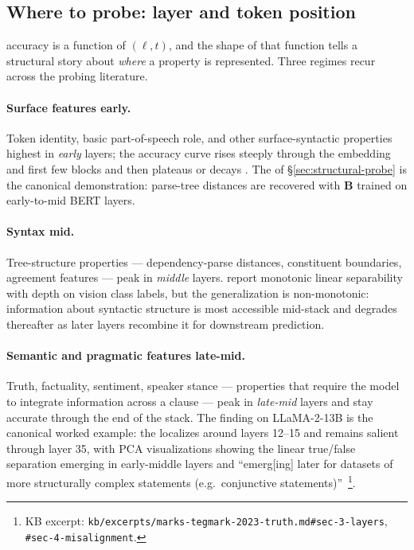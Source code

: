 \subsection{Where to probe: layer and token position}
\label{sec:probe-layer-position}

 accuracy is a function of $(\ell, t)$, and the shape of that
function tells a structural story about \emph{where} a property is
represented. Three regimes recur across the  probing literature.

\paragraph{Surface features early.} Token identity, basic part-of-speech
role, and other surface-syntactic properties  highest in
\emph{early} layers; the  accuracy curve rises steeply through the
embedding and first few  blocks and then plateaus or decays
\citep{hewitt2019-structural-probe}. The  of
\S\ref{sec:structural-probe} is the canonical demonstration: parse-tree
distances are recovered with $\mathbf{B}$ trained on early-to-mid BERT
layers.

\paragraph{Syntax mid.} Tree-structure properties — dependency-parse
distances, constituent boundaries, agreement features — peak in
\emph{middle} layers. \citet{alain-bengio-2017} report monotonic
linear separability with depth on vision class labels, but the 
generalization is non-monotonic: information about syntactic structure
is most accessible mid-stack and degrades thereafter as later layers
recombine it for downstream prediction.

\paragraph{Semantic and pragmatic features late-mid.} Truth, factuality,
sentiment, speaker stance — properties that require the model to
integrate information across a clause — peak in \emph{late-mid} layers
and stay accurate through the end of the stack. The
\citet{marks-tegmark-2023-truth} finding on LLaMA-2-13B is the canonical
worked example: the  localizes around layers 12--15 and
remains salient through layer 35, with PCA visualizations showing the
linear true/false separation emerging in early-middle layers and
``emerg[ing] later for datasets of more structurally complex statements
(e.g.\ conjunctive statements)''~\citep[\S 4]{marks-tegmark-2023-truth}\footnote{KB
excerpt: \texttt{kb/excerpts/marks-tegmark-2023-truth.md\#sec-3-layers},
\texttt{\#sec-4-misalignment}.}.

